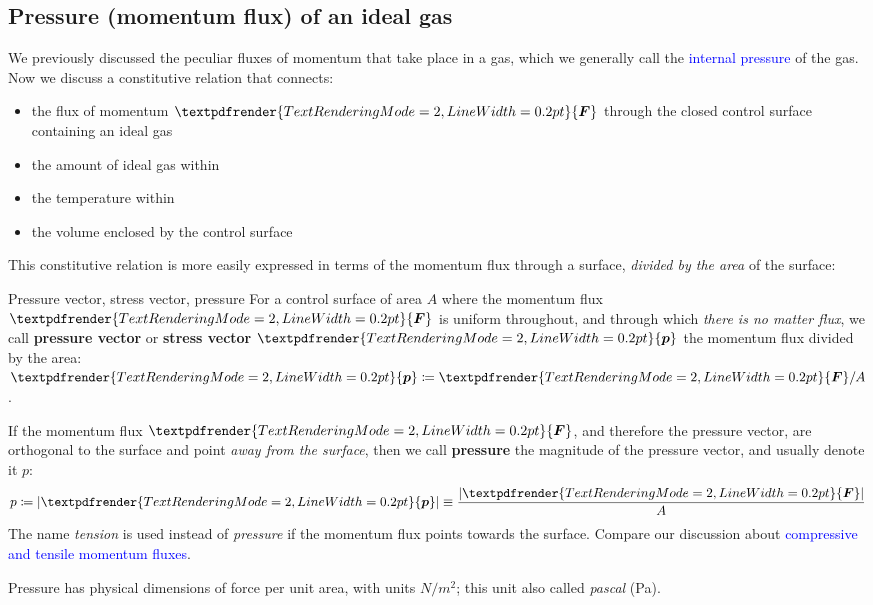 \documentclass[a4paper,12pt,%
onecolumn,oneside,%
british%
]{memoir}
\renewcommand*{\bm}[1]{\textpdfrender{TextRenderingMode=2,LineWidth=0.2pt}{\boldsymbol{#1}}}
\newcommand*{\defd}{\coloneqq}
\DeclarePairedDelimiter\abs{\lvert}{\rvert}
\renewcommand*{\|}[1][]{\nonscript\:#1\vert\nonscript\:\mathopen{}}
\newcommand*{\sect}{\S}%
\renewcommand*{\autoref}[2]{\sidepar{\vspace{-1ex}\footnotesize{\color{blue}\faIcon{%
angle-right%
}\enspace\sect~\ref{#1} page~\pageref{#1}}}\textcolor{blue}{#2}}
\newcommand*{\yF}{\bm{F}}
\newcommand*{\ypr}{p} %
\newcommand*{\ypv}{\bm{\ypr}} %
\begin{document}

\subsection{Pressure (momentum flux) of an ideal gas}
\label{sec:pressure_ideal_gas}

We previously discussed the peculiar fluxes of momentum that take place in a gas, which we generally call the \autoref{def:internal_pressure}{internal pressure} of the gas. Now we discuss a constitutive relation that connects:
\begin{itemize}[nosep]
\item the flux of momentum $\yF$ through the closed control surface containing an ideal gas
\item the amount of ideal gas within
\item the temperature within
\item the volume enclosed by the control surface
\end{itemize}

This constitutive relation is more easily expressed in terms of the momentum flux through a surface, \emph{divided by the area} of the surface:
\begin{definition}{{Pressure vector, stress vector, pressure}}
  For a control surface of area $A$ where the momentum flux $\yF$ is uniform throughout, and through which \emph{there is no matter flux}, we call \textbf{pressure vector} or \textbf{stress vector} $\ypv$ the momentum flux divided by the area: $\ypv \defd \yF/A$.

  \medskip

If the momentum flux $\yF$, and therefore the pressure vector, are orthogonal to the surface and point \emph{away from the surface}, then we call \textbf{pressure} the magnitude of the pressure vector, and usually denote it $\ypr$:
\begin{equation}
  \label{eq:pressure_def}
  \ypr \defd \abs{\ypv} \equiv \frac{\abs{\yF}}{A}
\end{equation}
The name \emph{tension} is used instead of \emph{pressure} if the momentum flux points towards the surface. Compare our discussion about \autoref{sec:pressure_tension_shear}{compressive and tensile momentum fluxes}.

\medskip

Pressure has physical dimensions of force per unit area, with units $\unit{N/m^{2}}$; this unit also called \emph{pascal} (\unit{Pa}).
\end{definition}
\end{document}
